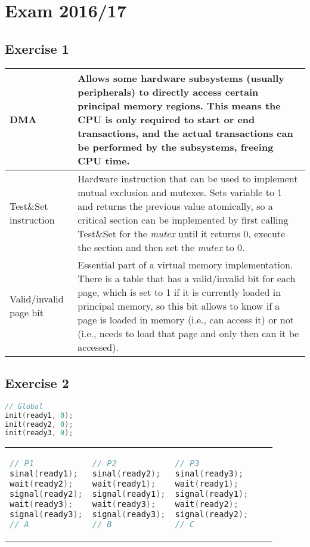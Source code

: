 \setcounter{chapter}{16}
\chapter{Exam 2016/17}
{
\renewcommand{\thesubsection}{\thesection\alph{subsection}}
\section{Exercise 1}
\begin{tabular}{p{29mm} | p{122mm}}
    DMA & Allows some hardware subsystems (usually peripherals) to directly access certain principal memory regions. This means the CPU is only required to start or end transactions, and the actual transactions can be performed by the subsystems, freeing CPU time. \\ \hline
    Test\&Set instruction & Hardware instruction that can be used to implement mutual exclusion and mutexes. Sets variable to 1 and returns the previous value atomically, so a critical section can be implemented by first calling Test\&Set for the \emph{mutex} until it returns 0, execute the section and then set the \emph{mutex} to 0. \\ \hline
    Valid/invalid page bit & Essential part of a virtual memory implementation. There is a table that has a valid/invalid bit for each page, which is set to 1 if it is currently loaded in principal memory, so this bit allows to know if a page is loaded in memory (i.e., can access it) or not (i.e., needs to load that page and only then can it be accessed).
\end{tabular}

\section{Exercise 2}
\begin{lstlisting}[language=C]
// Global
init(ready1, 0);
init(ready2, 0);
init(ready3, 0);
\end{lstlisting}
\begin{tabular}{p{49mm} p{49mm} p{49mm}}
    \begin{lstlisting}[language=C]
// P1
sinal(ready1);
wait(ready2);
signal(ready2);
wait(ready3);
signal(ready3);
// A    
    \end{lstlisting} &
    \begin{lstlisting}[language=C]
// P2
sinal(ready2);
wait(ready1);
signal(ready1);
wait(ready3);
signal(ready3);
// B    
    \end{lstlisting} &
    \begin{lstlisting}[language=C]
// P3
sinal(ready3);
wait(ready1);
signal(ready1);
wait(ready2);
signal(ready2);    
// C
    \end{lstlisting}
\end{tabular}

}
